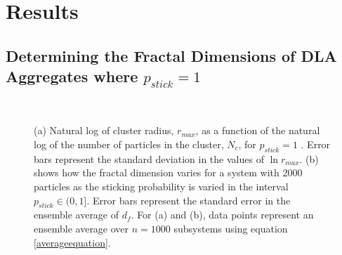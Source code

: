 \documentclass[11pt]{iopart}
\begin{document}
\section{Results}

\subsection{Determining the Fractal Dimensions of DLA Aggregates where $p_{stick} = 1$}

\begin{figure}[t]
    \centering
     \\
 
    \caption{(a) Natural log of cluster radius, $r_{max}$, as a function of the natural log of the number of particles in the cluster, $N_c$, for $p_{stick} = 1$ . Error bars represent the standard deviation in the values of $\ln r_{max}$. (b) shows how the fractal dimension varies for a system with 2000 particles as the sticking probability is varied in the interval $p_{stick} \in (0, 1]$. Error bars represent the standard error in the ensemble average of $d_f$. For (a) and (b), data points represent an ensemble average over $n=1000$ subsystems using equation \ref{averageequation}.}
        \label{fig:loggraph}
        \label{fig:stickinggraph}
\end{figure}
\end{document}
